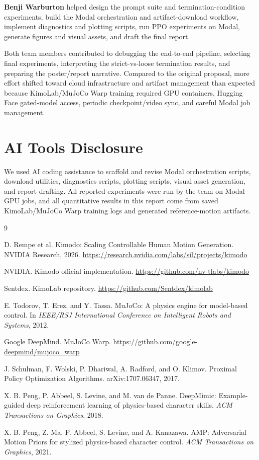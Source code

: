 \documentclass[10pt]{article}
\begin{document}
\textbf{Benji Warburton} helped design the prompt suite and termination-condition experiments, build the Modal orchestration and artifact-download workflow, implement diagnostics and plotting scripts, run PPO experiments on Modal, generate figures and visual assets, and draft the final report.

Both team members contributed to debugging the end-to-end pipeline, selecting final experiments, interpreting the strict-vs-loose termination results, and preparing the poster/report narrative. Compared to the original proposal, more effort shifted toward cloud infrastructure and artifact management than expected because KimoLab/MuJoCo Warp training required GPU containers, Hugging Face gated-model access, periodic checkpoint/video sync, and careful Modal job management.

\section*{AI Tools Disclosure}

We used AI coding assistance to scaffold and revise Modal orchestration scripts, download utilities, diagnostics scripts, plotting scripts, visual asset generation, and report drafting. All reported experiments were run by the team on Modal GPU jobs, and all quantitative results in this report come from saved KimoLab/MuJoCo Warp training logs and generated reference-motion artifacts.

\begin{thebibliography}{9}

D. Rempe et al.
\newblock Kimodo: Scaling Controllable Human Motion Generation.
\newblock NVIDIA Research, 2026.
\newblock \url{https://research.nvidia.com/labs/sil/projects/kimodo}

NVIDIA.
\newblock Kimodo official implementation.
\newblock \url{https://github.com/nv-tlabs/kimodo}

Sentdex.
\newblock KimoLab repository.
\newblock \url{https://github.com/Sentdex/kimolab}

E. Todorov, T. Erez, and Y. Tassa.
\newblock MuJoCo: A physics engine for model-based control.
\newblock In \emph{IEEE/RSJ International Conference on Intelligent Robots and Systems}, 2012.

Google DeepMind.
\newblock MuJoCo Warp.
\newblock \url{https://github.com/google-deepmind/mujoco_warp}

J. Schulman, F. Wolski, P. Dhariwal, A. Radford, and O. Klimov.
\newblock Proximal Policy Optimization Algorithms.
\newblock arXiv:1707.06347, 2017.

X. B. Peng, P. Abbeel, S. Levine, and M. van de Panne.
\newblock DeepMimic: Example-guided deep reinforcement learning of physics-based character skills.
\newblock \emph{ACM Transactions on Graphics}, 2018.

X. B. Peng, Z. Ma, P. Abbeel, S. Levine, and A. Kanazawa.
\newblock AMP: Adversarial Motion Priors for stylized physics-based character control.
\newblock \emph{ACM Transactions on Graphics}, 2021.

\end{thebibliography}
\end{document}

